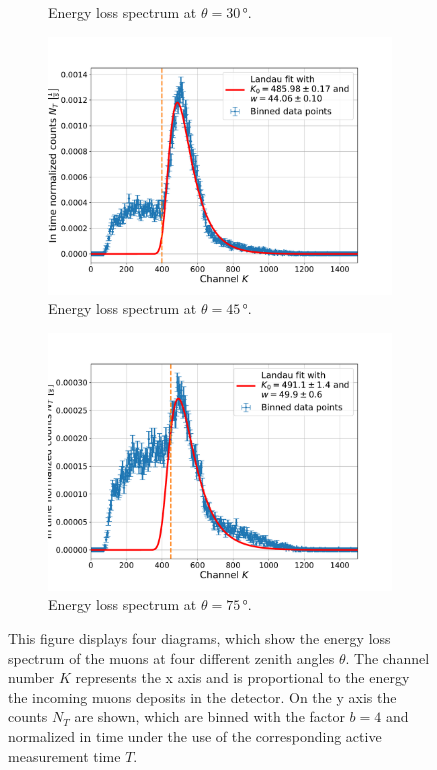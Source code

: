 \begin{figure}[H]
\begin{subfigure}[t]{0.495\textwidth}
		\caption{Energy loss spectrum at $\theta =30\,$°.}
		\label{EnergySpectrumAt30Degrees}
	\end{subfigure}
	\begin{subfigure}[t]{0.495\textwidth}
		\centering
		\includegraphics[width=\textwidth]{src/EnergySpectrumAt45Degrees}
		\caption{Energy loss spectrum at $\theta =45\,$°.}
		\label{EnergySpectrumAt45Degrees}
	\end{subfigure}
	\begin{subfigure}[t]{0.495\textwidth}
		\centering
		\includegraphics[width=\textwidth]{src/EnergySpectrumAt75Degrees}
		\caption{Energy loss spectrum at $\theta =75\,$°.}
		\label{EnergySpectrumAt75Degrees}
	\end{subfigure}
	\caption{This figure displays four diagrams, which show the energy loss spectrum of the muons at four different zenith angles $\theta$. The channel number $K$ represents the x axis and is proportional to the energy the incoming muons deposits in the detector. On the y axis the counts $N_T$ are shown, which are binned with the factor $b=4$ and normalized in time under the use of the corresponding active measurement time $T$.}
	\label{EnergySpectrum}
\end{figure}
